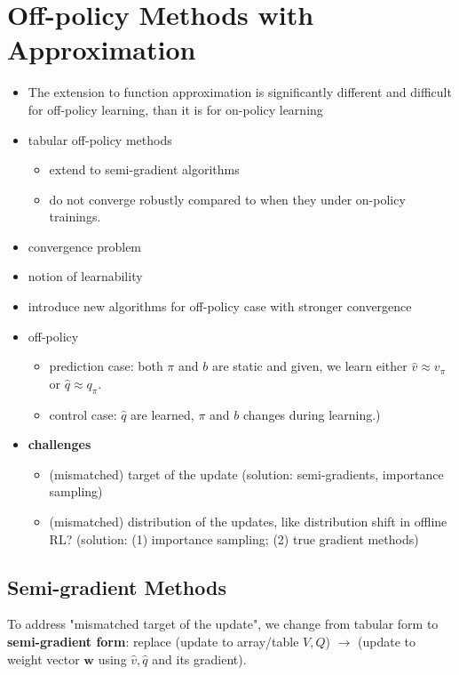 \documentclass[sutton_barto_notes.tex]{subfiles}
\begin{document}
\newpage
\section{Off-policy Methods with Approximation}

\begin{itemize}
\item The extension to function approximation is significantly different and difficult for off-policy learning, than it is for on-policy learning
\item tabular off-policy methods
\begin{itemize}
	\item extend to semi-gradient algorithms
	\item do not converge robustly compared to when they under on-policy trainings.
\end{itemize}
\item convergence problem
\item notion of learnability
\item introduce new algorithms for off-policy case with stronger convergence
\item off-policy
\begin{itemize}
	\item prediction case: both $\pi$ and $b$ are static and given, we learn either $\hat{v} \approx v_\pi$ or $\hat{q}\approx q_\pi$.
	\item control case: $\hat{q}$ are learned, $\pi$ and $b$ changes during learning.)
\end{itemize}
\item \textbf{challenges}
\begin{itemize}
\item (mismatched) target of the update (solution: semi-gradients, importance sampling)
\item (mismatched) distribution of the updates, like distribution shift in offline RL? (solution: (1) importance sampling; (2) true gradient methods)
\end{itemize}
\end{itemize}

\subsection{Semi-gradient Methods}

To address "mismatched target of the update", we change from tabular form to \textbf{semi-gradient form}: replace (update to array/table $V,Q$) $\rightarrow$ (update to weight vector $\bm{w}$ using $\hat{v},\hat{q}$ and its gradient).
\end{document}
